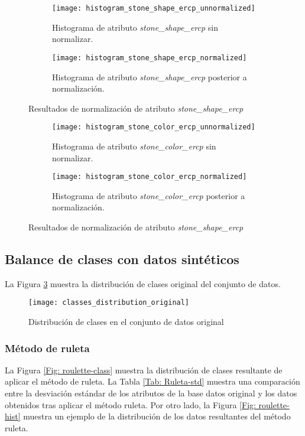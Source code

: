 \begin{figure}[!htb]
	\centering
	\begin{subfigure}[b]{0.4\textwidth}
		\centering
		\texttt{[image: histogram\_stone\_shape\_ercp\_unnormalized]}
		\caption{Histograma de atributo \emph{stone\_shape\_ercp} sin normalizar.}
	\end{subfigure}
	\hfill
	\begin{subfigure}[b]{0.4\textwidth}
		\centering
		\texttt{[image: histogram\_stone\_shape\_ercp\_normalized]}
		\caption{Histograma de atributo \emph{stone\_shape\_ercp} posterior a normalización.}
	\end{subfigure}
	\caption{Resultados de normalización de atributo \emph{stone\_shape\_ercp}}
	\label{Fig: stone_shape_ercp_NORM}
\end{figure}


\begin{figure}[!htb]
	\centering
	\begin{subfigure}[b]{0.4\textwidth}
		\centering
		\texttt{[image: histogram\_stone\_color\_ercp\_unnormalized]}
		\caption{Histograma de atributo \emph{stone\_color\_ercp} sin normalizar.}
	\end{subfigure}
	\hfill
	\begin{subfigure}[b]{0.4\textwidth}
		\centering
		\texttt{[image: histogram\_stone\_color\_ercp\_normalized]}
		\caption{Histograma de atributo \emph{stone\_color\_ercp} posterior a normalización.}
	\end{subfigure}
	\caption{Resultados de normalización de atributo \emph{stone\_shape\_ercp}}
	\label{Fig: stone_shape_ercp_NORM}
\end{figure}


\FloatBarrier
\hfill \break
\subsection{Balance de clases con datos sintéticos}
La Figura \ref{Fig: original-class} muestra la distribución de clases original del conjunto de datos.

\begin{figure}[!htb]
	\centering
	\texttt{[image: classes\_distribution\_original]}
	\caption{Distribución de clases en el conjunto de datos original}
	\label{Fig: original-class}
\end{figure}

\FloatBarrier
\subsubsection{Método de ruleta}
La Figura \ref{Fig: roulette-class} muestra la distribución de clases resultante de aplicar el método de ruleta. La Tabla \ref{Tab: Ruleta-std} muestra una comparación entre la desviación estándar de los atributos de la base datos original y los datos obtenidos tras aplicar el método ruleta. Por otro lado, la Figura \ref{Fig: roulette-hist} muestra un ejemplo de la distribución de los datos resultantes del método ruleta.


